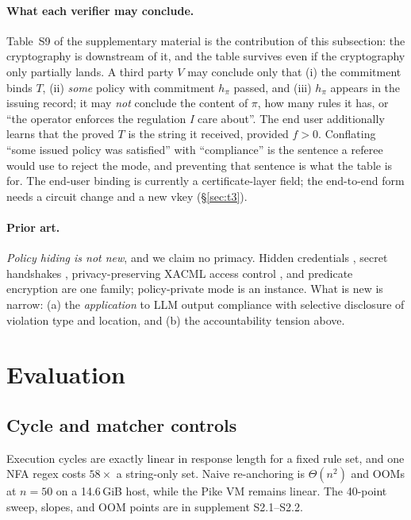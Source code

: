 \documentclass[10pt,journal,compsoc]{IEEEtran}
\newcommand{\need}[1]{}
\newcommand{\need}[1]{\textcolor{blue}{[[ NEED: #1 ]]}}
\begin{document}
\paragraph{What each verifier may conclude.} Table~S9 of the supplementary
material is the contribution of this subsection: the cryptography is downstream
of it, and the table survives even if the cryptography only partially lands. A
third party $V$ may conclude only that (i) the commitment binds $T$, (ii)
\emph{some} policy with commitment $h_\pi$ passed, and (iii) $h_\pi$ appears in
the issuing record; it may \emph{not} conclude the content of $\pi$, how many
rules it has, or ``the operator enforces the regulation \emph{I} care about''.
The end user additionally learns that the proved $T$ is the string it received,
provided $f>0$. Conflating ``some issued policy was satisfied'' with
``compliance'' is the sentence a referee would use to reject the mode, and
preventing that sentence is what the table is for. The end-user binding is
currently a certificate-layer field; the end-to-end form needs a circuit change
and a new vkey (\S\ref{sec:t3}).

\paragraph{Prior art.} \emph{Policy hiding is not new}, and we claim no primacy.
Hidden credentials \cite{hiddencred}, secret handshakes \cite{handshake},
privacy-preserving XACML access control \cite{xacmlpriv}, and predicate
encryption \cite{sw05,ksw08} are one family; policy-private mode is an instance.
What is new is narrow: (a) the \emph{application} to LLM output compliance with
selective disclosure of violation type and location, and (b) the accountability
tension above.

\need{BLOCKER (author decision): the instantiation of (P-PP)---an on-chain
registry of issued policy commitments versus a signed manifest---is not fixed;
both are compatible with the text. The five prior-art citations are verified in
\texttt{docs/citation-audit.md}.}

\section{Evaluation}
\label{sec:eval}

\subsection{Cycle and matcher controls}
\label{sec:eval-cycles}
\label{sec:eval-ablation}
Execution cycles are exactly linear in response length for a fixed rule set, and
one NFA regex costs $58\times$ a string-only set. Naive re-anchoring is
$\Theta(n^2)$ and OOMs at $n=50$ on a 14.6\,GiB host, while the Pike VM remains
linear. The 40-point sweep, slopes, and OOM points are in supplement S2.1--S2.2.
\end{document}
